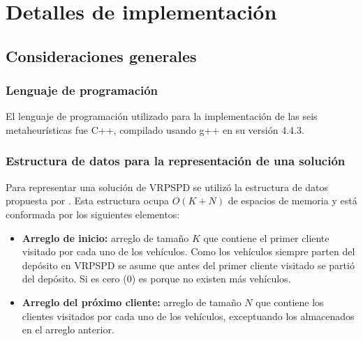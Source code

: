 \chapter{Detalles de implementación} \label{chap:implementacion}

\section{Consideraciones generales} \label{sect:implementacion-consideraciones}

\subsection{Lenguaje de programación} \label{sect:implementacion-lenguaje}

El lenguaje de programación utilizado para la implementación de las seis metaheurísticas fue C++, compilado usando g++ en su versión 4.4.3.

\subsection{Estructura de datos para la representación de una solución} \label{sect:implementacion-estructura}

Para representar una solución de VRPSPD se utilizó la estructura de datos propuesta por \cite{tesisdanielernesto}. Esta estructura ocupa $O(K + N)$ de espacios de memoria y está conformada por los siguientes elementos:

\begin{itemize}
\item \textbf{Arreglo de inicio: } arreglo de tamaño $K$ que contiene el primer cliente visitado por cada uno de los vehículos. Como los vehículos siempre parten del depósito en VRPSPD se asume que antes del primer cliente visitado se partió del depósito. Si es cero ($0$) es porque no existen más vehículos.
\item \textbf{Arreglo del próximo cliente: } arreglo de tamaño $N$ que contiene los clientes visitados por cada uno de los vehículos, exceptuando los almacenados en el arreglo anterior.
\end{itemize}

